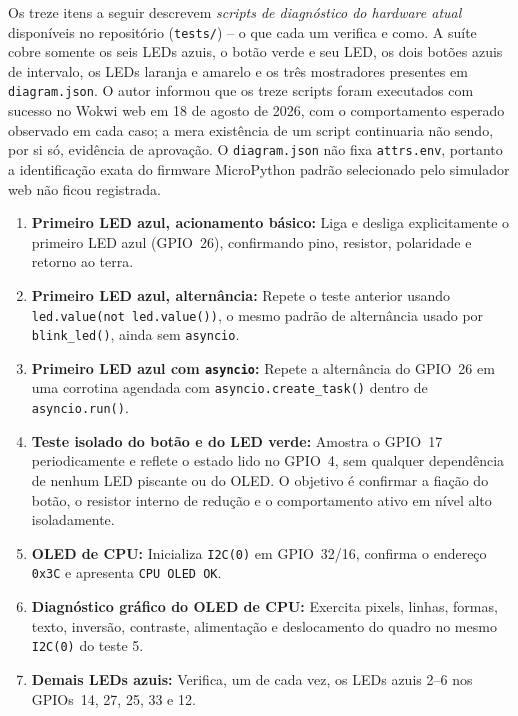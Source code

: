 \documentclass[12pt,a4paper]{article}
\begin{document}
Os treze itens a seguir descrevem \emph{scripts de diagnóstico do hardware atual} disponíveis no repositório (\texttt{tests/}) -- o que cada um verifica e como. A suíte cobre somente os seis LEDs azuis, o botão verde e seu LED, os dois botões azuis de intervalo, os LEDs laranja e amarelo e os três mostradores presentes em \texttt{diagram.json}. O autor informou que os treze scripts foram executados com sucesso no Wokwi web em 18 de agosto de 2026, com o comportamento esperado observado em cada caso; a mera existência de um script continuaria não sendo, por si só, evidência de aprovação. O \texttt{diagram.json} não fixa \texttt{attrs.env}, portanto a identificação exata do firmware MicroPython padrão selecionado pelo simulador web não ficou registrada.

\begin{enumerate}
  \item \textbf{Primeiro LED azul, acionamento básico:} Liga e desliga explicitamente o primeiro LED azul (GPIO~26), confirmando pino, resistor, polaridade e retorno ao terra.

  \item \textbf{Primeiro LED azul, alternância:} Repete o teste anterior usando \texttt{led.value(not led.value())}, o mesmo padrão de alternância usado por \texttt{blink\_led()}, ainda sem \texttt{asyncio}.

  \item \textbf{Primeiro LED azul com \texttt{asyncio}:} Repete a alternância do GPIO~26 em uma corrotina agendada com \texttt{asyncio.create\_task()} dentro de \texttt{asyncio.run()}.

  \item \textbf{Teste isolado do botão e do LED verde:} Amostra o GPIO~17 periodicamente e reflete o estado lido no GPIO~4, sem qualquer dependência de nenhum LED piscante ou do OLED. O objetivo é confirmar a fiação do botão, o resistor interno de redução e o comportamento ativo em nível alto isoladamente.

  \item \textbf{OLED de CPU:} Inicializa \texttt{I2C(0)} em GPIO~32/16, confirma o endereço \texttt{0x3C} e apresenta \texttt{CPU OLED OK}.

  \item \textbf{Diagnóstico gráfico do OLED de CPU:} Exercita pixels, linhas, formas, texto, inversão, contraste, alimentação e deslocamento do quadro no mesmo \texttt{I2C(0)} do teste 5.

  \item \textbf{Demais LEDs azuis:} Verifica, um de cada vez, os LEDs azuis 2--6 nos GPIOs~14, 27, 25, 33 e 12.


\end{enumerate}
\end{document}
